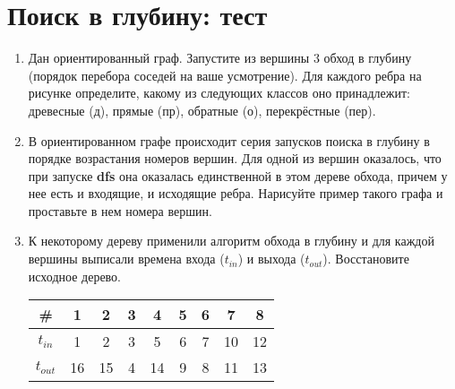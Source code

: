 \documentclass[a4paper,10pt]{article}
\begin{document}
  \section{Поиск в глубину: тест}

  \begin{enumerate}
    \item
      Дан ориентированный граф. Запустите из вершины $3$ обход в глубину
      (порядок перебора соседей на ваше усмотрение). Для каждого ребра на рисунке
      определите, какому из следующих классов оно принадлежит: древесные (д), прямые (пр),
      обратные (о), перекрёстные (пер).

      \begin{center}
      \end{center}

    \item
      В ориентированном графе происходит серия запусков поиска в глубину в порядке
      возрастания номеров вершин. Для одной из вершин оказалось, что при запуске
      \textbf{dfs} она оказалась единственной в этом дереве обхода, причем у нее
      есть и входящие, и исходящие ребра. Нарисуйте пример такого графа и проставьте
      в нем номера вершин.

      \vskip 4cm

    \item
      К некоторому дереву применили алгоритм обхода в глубину и для каждой вершины
      выписали времена входа ($t_{in}$) и выхода ($t_{out}$). Восстановите исходное дерево.
      \begin{center}
        \begin{tabular}{|c|c|c|c|c|c|c|c|c|}
          \hline
          \# & 1 & 2 & 3 & 4 & 5 & 6 & 7 & 8 \\
          \hline
          $t_{in}$ & 1 & 2 & 3 & 5 & 6 & 7 & 10 & 12 \\
          \hline
          $t_{out}$ & 16 & 15 & 4 & 14 & 9 & 8 & 11 & 13 \\
          \hline
        \end{tabular}
      \end{center}


\end{enumerate}
\end{document}

